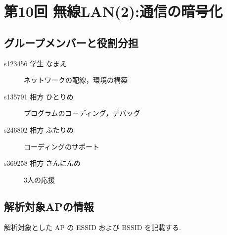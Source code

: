 \documentclass[a4j]{celb-report}
\begin{document}

\newpage
\section{第10回 無線LAN(2):通信の暗号化}
\subsection{グループメンバーと役割分担}
%
\begin{description}
 \item[s123456 学生 なまえ] ネットワークの配線，環境の構築
 \item[s135791 相方 ひとりめ] プログラムのコーディング，デバッグ
 \item[s246802 相方 ふたりめ] コーディングのサポート
 \item[s369258 相方 さんにんめ] 3人の応援
\end{description}
\setcounter{subsection}{2}
\subsection{解析対象APの情報}
解析対象とした AP の ESSID および BSSID を記載する.

\end{document}
